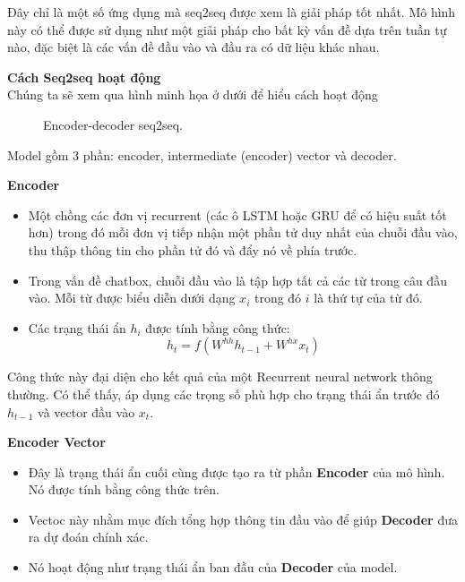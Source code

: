Đây chỉ là một số ứng dụng mà seq2seq được xem là giải pháp tốt nhất. Mô hình này có thể được sử dụng như một giải
pháp cho bất kỳ vấn đề dựa trên tuần tự nào, đặc biệt là các vấn đề đầu vào và đầu ra có dữ liệu khác nhau.

\large{\textbf{Cách Seq2seq hoạt động}} \\[0.2em]
Chúng ta sẽ xem qua hình minh họa ở dưới để hiểu cách hoạt động

\begin{figure}[!htb]
    \caption{\label{fig:seq-encoderdecoder} Encoder-decoder seq2seq.}
\end{figure}

Model gồm 3 phần: encoder, intermediate (encoder) vector và decoder.

\textbf{Encoder}
\begin{itemize}
    \item Một chồng các đơn vị recurrent (các ô LSTM hoặc GRU để có hiệu suất tốt hơn) trong đó mỗi đơn vị tiếp
     nhận một phần tử duy nhất của chuỗi đầu vào, thu thập thông tin cho phần tử đó và đẩy nó về phía trước.
    \item Trong vấn đề chatbox, chuỗi đầu vào là tập hợp tất cả các từ trong câu đầu vào. Mỗi từ được biểu diễn
    dưới dạng \(x_i\) trong đó \(i\) là thứ tự của từ đó.
    \item Các trạng thái ẩn \(h_i\) được tính bằng công thức:
        \[h_t=f(W^{hh}h_{t-1} + W^{hx}x_t)\]
\end{itemize}
Công thức này đại diện cho kết quả của một Recurrent neural network thông thường. Có thể thấy, áp dụng
các trọng số phù hợp cho trạng thái ẩn trước đó \(h_{t-1}\) và vector đầu vào \(x_t\).

\textbf{Encoder Vector}
\begin{itemize}
    \item Đây là trạng thái ẩn cuối cùng được tạo ra từ phần \textbf{Encoder} của mô hình. Nó được tính bằng công thức trên.
    \item Vectoc này nhằm mục đích tổng hợp thông tin đầu vào để giúp \textbf{Decoder} đưa ra dự đoán chính xác.
    \item Nó hoạt động như trạng thái ẩn ban đầu của \textbf{Decoder} của model.
\end{itemize}

